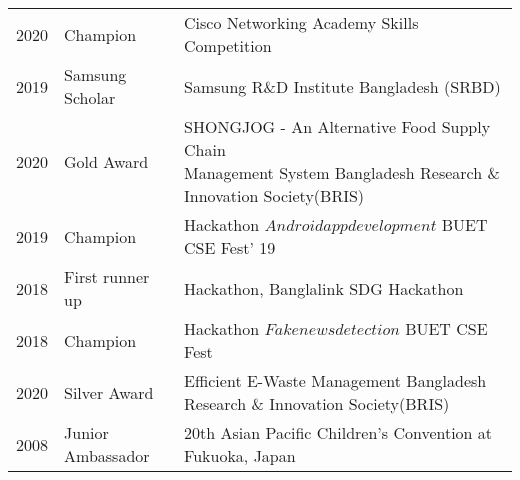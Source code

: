 \documentclass[letterpaper]{deedy-resume} %
\begin{document}
\begin{minipage}[t]{0.66\textwidth}
\begin{tabular}{rll}
2020	 & Champion & Cisco Networking Academy Skills Competition \\
2019	 & Samsung Scholar & Samsung R\&D Institute Bangladesh (SRBD) \\
2020	 & Gold Award & \makecell{SHONGJOG - An Alternative Food Supply Chain \\ Management System}
Bangladesh Research \& Innovation Society(BRIS) \\
2019	 & Champion & Hackathon \(Android app development\) BUET CSE Fest' 19\\
2018 & First runner up & Hackathon, Banglalink SDG Hackathon \\
2018 & Champion & Hackathon \(Fake news detection\) BUET CSE Fest \\
2020 & Silver Award & Efficient E-Waste Management
Bangladesh Research \& Innovation Society(BRIS) \\
2008 & Junior Ambassador & 20th Asian Pacific Children's Convention at Fukuoka, Japan\\
\end{tabular}

\sectionspace %




\sectionspace %


\end{minipage} %

\end{document}
